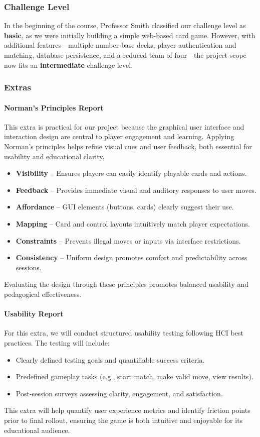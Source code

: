 \documentclass[12pt, titlepage]{article}
\begin{document}
\subsubsection{Challenge Level}
In the beginning of the course, Professor Smith classified our challenge level as \textbf{basic}, as we were initially building a simple web-based card game. However, with additional features—multiple number-base decks, player authentication and matching, database persistence, and a reduced team of four—the project scope now fits an \textbf{intermediate} challenge level.

\subsubsection{Extras}
\paragraph{Norman’s Principles Report}
This extra is practical for our project because the graphical user interface and interaction design are central to player engagement and learning. Applying Norman’s principles helps refine visual cues and user feedback, both essential for usability and educational clarity.  
\begin{itemize}
    \item \textbf{Visibility} – Ensures players can easily identify playable cards and actions.  
    \item \textbf{Feedback} – Provides immediate visual and auditory responses to user moves.  
    \item \textbf{Affordance} – GUI elements (buttons, cards) clearly suggest their use.  
    \item \textbf{Mapping} – Card and control layouts intuitively match player expectations.  
    \item \textbf{Constraints} – Prevents illegal moves or inputs via interface restrictions.  
    \item \textbf{Consistency} – Uniform design promotes comfort and predictability across sessions.  
\end{itemize}
Evaluating the design through these principles promotes balanced usability and pedagogical effectiveness.

\paragraph{Usability Report}
For this extra, we will conduct structured usability testing following HCI best practices. The testing will include:
\begin{itemize}
    \item Clearly defined testing goals and quantifiable success criteria.  
    \item Predefined gameplay tasks (e.g., start match, make valid move, view results).  
    \item Post-session surveys assessing clarity, engagement, and satisfaction.  
\end{itemize}
This extra will help quantify user experience metrics and identify friction points prior to final rollout, ensuring the game is both intuitive and enjoyable for its educational audience.
\end{document}
